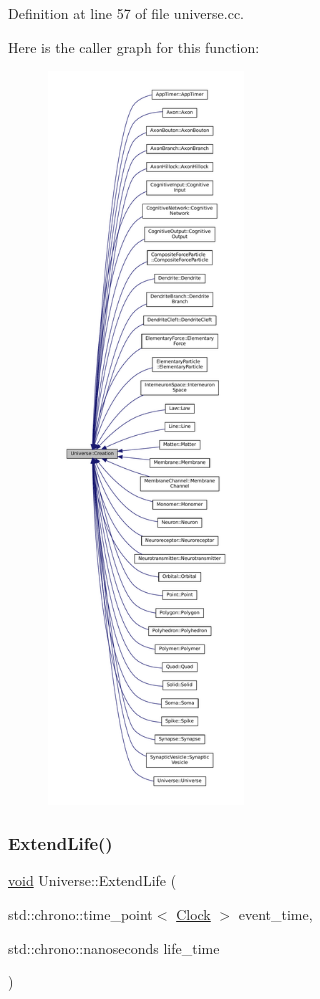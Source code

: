 Definition at line 57 of file universe.\+cc.

Here is the caller graph for this function\+:\nopagebreak
\begin{figure}[H]
\begin{center}
\leavevmode
\includegraphics[height=550pt]{class_universe_a28615baf47d4558cbe5eebeed6575024_icgraph}
\end{center}
\end{figure}
\mbox{\label{class_universe_a982502e46868a00a9111738ccc9355c2}} 
\subsubsection{\texorpdfstring{Extend\+Life()}{ExtendLife()}}
{\footnotesize\ttfamily \mbox{\hyperlink{glad_8h_a950fc91edb4504f62f1c577bf4727c29}{void}} Universe\+::\+Extend\+Life (\begin{DoxyParamCaption}\item[{std\+::chrono\+::time\+\_\+point$<$ \mbox{\hyperlink{universe_8h_a0ef8d951d1ca5ab3cfaf7ab4c7a6fd80}{Clock}} $>$}]{event\+\_\+time,  }\item[{std\+::chrono\+::nanoseconds}]{life\+\_\+time }\end{DoxyParamCaption})}




